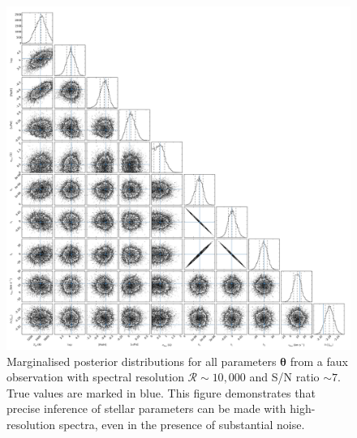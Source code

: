 \documentclass{aastex}
\begin{document}
\begin{figure}
\label{fig:corner-inference}
\includegraphics[width=\textwidth]{corner.pdf}
\caption{Marginalised posterior distributions for all parameters $\bm{\theta}$ from a faux observation with spectral resolution $\mathcal{R} \sim 10,000$ and S/N ratio $\sim{}7$. True values are marked in blue. This figure demonstrates that precise inference of stellar parameters can be made with high-resolution spectra, even in the presence of substantial noise.}
\end{figure}
\end{document}
